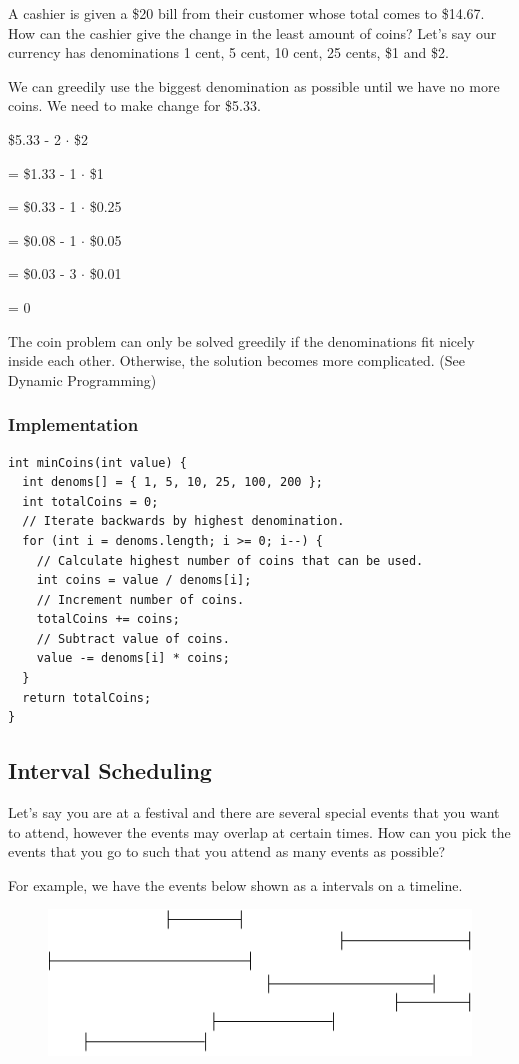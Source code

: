 \documentclass[11pt,oneside]{book}
\makeatletter
\def\maxwidth#1{\ifdim\Gin@nat@width>#1 #1\else\Gin@nat@width\fi}
\makeatother
\begin{document}
A cashier is given a \$20 bill from their customer whose total comes to \$14.67. How can the cashier give the change in the least amount of coins? Let's say our currency has denominations 1 cent, 5 cent, 10 cent, 25 cents, \$1 and \$2.

We can greedily use the biggest denomination as possible until we have no more coins. We need to make change for \$5.33.

\$5.33 - 2 $\cdot$ \$2

= \$1.33 - 1 $\cdot$ \$1

= \$0.33 - 1 $\cdot$ \$0.25

= \$0.08 - 1 $\cdot$ \$0.05

= \$0.03 - 3 $\cdot$ \$0.01

= 0

The coin problem can only be solved greedily if the denominations fit nicely inside each other. Otherwise, the solution becomes more complicated. (See Dynamic Programming)

\subsubsection{Implementation}

\begin{lstlisting}
int minCoins(int value) {
  int denoms[] = { 1, 5, 10, 25, 100, 200 };
  int totalCoins = 0;
  // Iterate backwards by highest denomination.
  for (int i = denoms.length; i >= 0; i--) {
    // Calculate highest number of coins that can be used.
    int coins = value / denoms[i];
    // Increment number of coins.
    totalCoins += coins;
    // Subtract value of coins.
    value -= denoms[i] * coins;
  }
  return totalCoins;
}
\end{lstlisting}

\subsection{Interval Scheduling}

Let's say you are at a festival and there are several special events that you want to attend, however the events may overlap at certain times. How can you pick the events that you go to such that you attend as many events as possible?

For example, we have the events below shown as a intervals on a timeline.

\vspace{5px}\begin{figure}[H]\centering
        \includegraphics[width=0.66\maxwidth{\textwidth}]{intervalschedule.png}
        \end{figure}
\end{document}
